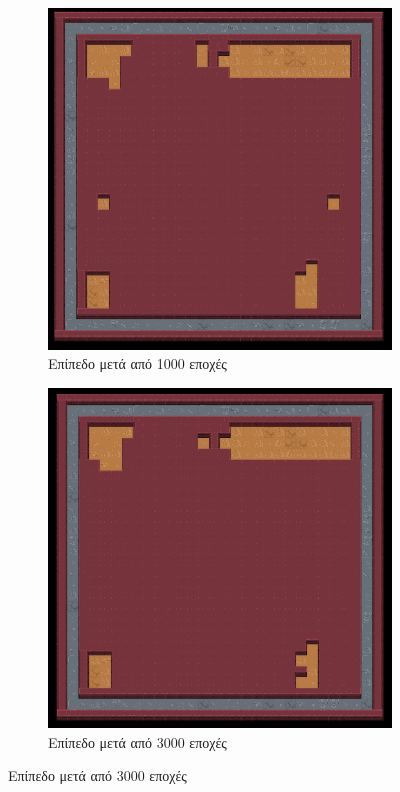 \begin{figure}[H]
\begin{subfigure}{.5\textwidth}
  \centering
  \includegraphics[width=.8\linewidth]{../images/result_images/dense-gan-with-fuzzy/combined_1000.png}
  \caption{Επίπεδο μετά από 1000 εποχές}
  \label{fig:sfig1}
\end{subfigure}%
\begin{subfigure}{.5\textwidth}
  \centering
  \includegraphics[width=.8\linewidth]{../images/result_images/dense-gan-with-fuzzy/combined_3000.png}
  \caption{Επίπεδο μετά από 3000 εποχές}
  \label{fig:sfig2}
\end{subfigure}

\end{figure}
